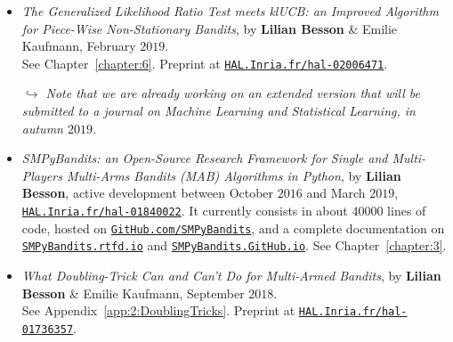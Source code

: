 \begin{itemize}

\item
    \emph{The Generalized Likelihood Ratio Test meets klUCB: an Improved Algorithm for Piece-Wise Non-Stationary Bandits},
    by \textbf{Lilian Besson} \& Emilie Kaufmann,
    February $2019$.\\
    See Chapter~\ref{chapter:6}.
    Preprint at \href{https://HAL.Inria.fr/hal-02006471}{\texttt{HAL.Inria.fr/hal-02006471}}.
    \cite{Besson2019GLRT}

    \emph{$\hookrightarrow$ Note that we are already working on an extended version that will be submitted to a journal on Machine Learning and Statistical Learning, in autumn $2019$.}

\item
    \emph{SMPyBandits: an Open-Source Research Framework for Single and Multi-Players Multi-Arms Bandits (MAB) Algorithms in Python},
    by \textbf{Lilian Besson}, active development between October $2016$ and March $2019$,
    \href{https://HAL.Inria.fr/hal-01840022}{\texttt{HAL.Inria.fr/hal-01840022}}.
    It currently consists in about $40000$ lines of code, hosted on \href{https://GitHub.com/SMPyBandits}{\texttt{GitHub.com/SMPyBandits}},
    and a complete documentation on \href{https://SMPyBandits.rtfd.io}{\texttt{SMPyBandits.rtfd.io}} and \href{https://SMPyBandits.GitHub.io}{\texttt{SMPyBandits.GitHub.io}}.
    See Chapter~\ref{chapter:3}.
    \cite{SMPyBandits,SMPyBanditsJMLR}

\item
    \emph{What Doubling-Trick Can and Can't Do for Multi-Armed Bandits},
    by \textbf{Lilian Besson} \& Emilie Kaufmann,
    September $2018$.\\
    See Appendix~\ref{app:2:DoublingTricks}.
    Preprint at \href{https://HAL.Inria.fr/hal-01736357}{\texttt{HAL.Inria.fr/hal-01736357}}.
    \cite{Besson2018DoublingTricks}

\end{itemize}




